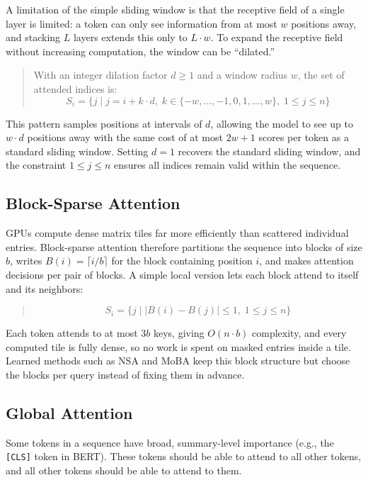 \documentclass{article}
\begin{document}
A limitation of the simple sliding window is that the receptive field of a single layer is limited: a token can only see information from at most \(w\) positions away, and stacking \(L\) layers extends this only to \(L \cdot w\). To expand the receptive field without increasing computation, the window can be ``dilated.''
\begin{quote}
With an integer dilation factor \(d \ge 1\) and a window radius \(w\), the set of attended indices is:
\[
S_i = \{j \mid j = i + k \cdot d, \; k \in \{-w, \ldots, -1, 0, 1, \ldots, w\}, \; 1 \le j \le n \}
\]
\end{quote}
This pattern samples positions at intervals of \(d\), allowing the model to see up to \(w \cdot d\) positions away with the same cost of at most \(2w+1\) scores per token as a standard sliding window. Setting \(d = 1\) recovers the standard sliding window, and the constraint \(1 \le j \le n\) ensures all indices remain valid within the sequence.

\subsection{Block-Sparse Attention}

GPUs compute dense matrix tiles far more efficiently than scattered individual entries. Block-sparse attention therefore partitions the sequence into blocks of size \(b\), writes \(B(i) = \lceil i / b \rceil\) for the block containing position \(i\), and makes attention decisions per pair of blocks. A simple local version lets each block attend to itself and its neighbors:
\begin{quote}
\[
S_i = \{j \mid |B(i) - B(j)| \le 1, \; 1 \le j \le n \}
\]
\end{quote}
Each token attends to at most \(3b\) keys, giving \(O(n \cdot b)\) complexity, and every computed tile is fully dense, so no work is spent on masked entries inside a tile. Learned methods such as NSA and MoBA keep this block structure but choose the blocks per query instead of fixing them in advance.

\subsection{Global Attention}

Some tokens in a sequence have broad, summary-level importance (e.g., the \texttt{[CLS]} token in BERT). These tokens should be able to attend to all other tokens, and all other tokens should be able to attend to them.
\end{document}
